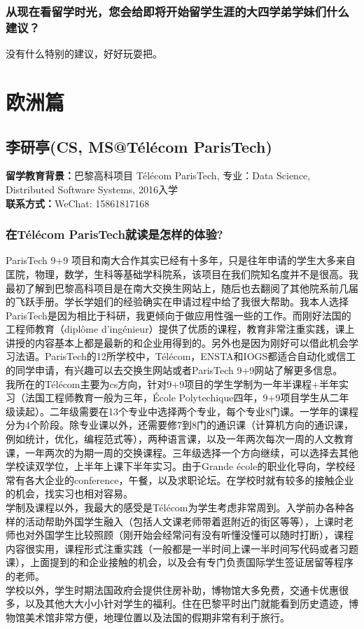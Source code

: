 \documentclass[a4paper,UTF8]{book}
\begin{document}
    \subsubsection*{从现在看留学时光，您会给即将开始留学生涯的大四学弟学妹们什么建议？}
    没有什么特别的建议，好好玩耍把。



\clearpage
\section{欧洲篇}

\subsection{李研亭(CS, MS@Télécom ParisTech)}
    \textbf{留学教育背景：}巴黎高科项目 Télécom ParisTech, 
    专业：Data Science, Distributed Software Systems, 
    2016入学\\
    \textbf{联系方式：}WeChat: 15861817168

    \subsubsection*{在Télécom ParisTech就读是怎样的体验?}
    ParisTech 9+9 项目和南大合作其实已经有十多年，只是往年申请的学生大多来自匡院，物理，数学，生科等基础学科院系，该项目在我们院知名度并不是很高。我最初了解到巴黎高科项目是在南大交换生网站上，随后也去翻阅了其他院系前几届的飞跃手册。学长学姐们的经验确实在申请过程中给了我很大帮助。我本人选择ParisTech是因为相比于科研，我更倾向于做应用性强一些的工作。而刚好法国的工程师教育（diplôme d’ingénieur）提供了优质的课程，教育非常注重实践，课上讲授的内容基本上都是最新的和企业用得到的。另外也是因为刚好可以借此机会学习法语。ParisTech的12所学校中，Télécom，ENSTA和IOGS都适合自动化或信工的同学申请，有兴趣可以去交换生网站或者ParisTech 9+9网站了解更多信息。\\
    我所在的Télécom主要为cs方向，针对9+9项目的学生学制为一年半课程+半年实习（法国工程师教育一般为三年，École Polytechique四年，9+9项目学生从二年级读起）。二年级需要在13个专业中选择两个专业，每个专业8门课。一学年的课程分为4个阶段。除专业课以外，还需要修7到8门的通识课（计算机方向的通识课，例如统计，优化，编程范式等），两种语言课，以及一年两次每次一周的人文教育课，一年两次的为期一周的交换课程。三年级选择一个方向继续，可以选择去其他学校读双学位，上半年上课下半年实习。由于Grande école的职业化导向，学校经常有各大企业的conference，午餐，以及求职论坛。在学校时就有较多的接触企业的机会，找实习也相对容易。\\
    学制及课程以外，我最大的感受是Télécom为学生考虑非常周到。入学前办各种各样的活动帮助外国学生融入（包括人文课老师带着逛附近的街区等等），上课时老师也对外国学生比较照顾（刚开始会经常问有没有听懂没懂可以随时打断），课程内容很实用，课程形式注重实践（一般都是一半时间上课一半时间写代码或者习题课），上面提到的和企业接触的机会，以及会有专门负责国际学生签证居留等程序的老师。\\
    学校以外，学生时期法国政府会提供住房补助，博物馆大多免费，交通卡优惠很多，以及其他大大小小针对学生的福利。住在巴黎平时出门就能看到历史遗迹，博物馆美术馆非常方便，地理位置以及法国的假期非常有利于旅行。
    
\end{document}
